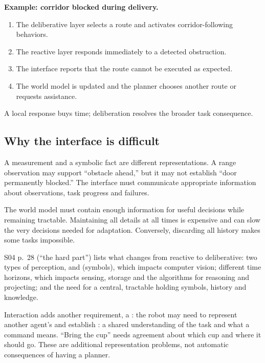 \textbf{Example: corridor blocked during delivery.}
\begin{enumerate}
\item The deliberative layer selects a route and activates corridor-following behaviors.
\item The reactive layer responds immediately to a detected obstruction.
\item The interface reports that the route cannot be executed as expected.
\item The world model is updated and the planner chooses another route or requests assistance.
\end{enumerate}
A local response buys time; deliberation resolves the broader task consequence.

\subsection{Why the interface is difficult}
A measurement and a symbolic fact are different representations. A range observation may support ``obstacle ahead,'' but it may not establish ``door permanently blocked.'' The interface must communicate appropriate information about observations, task progress and failures.

The world model must contain enough information for useful decisions while remaining tractable. Maintaining all details at all times is expensive and can slow the very decisions needed for adaptation. Conversely, discarding all history makes some tasks impossible.

S04 p.~28 (``the hard part'') lists what changes from reactive to deliberative: two types of perception,  and  (symbols), which impacts computer vision; different time horizons, which impacts sensing, storage and the algorithms for reasoning and projecting; and the need for a central, tractable  holding symbols, history and knowledge.

Interaction adds another requirement, a : the robot may need to represent another agent's  and establish : a shared understanding of the task and what a command means. ``Bring the cup'' needs agreement about which cup and where it should go. These are additional representation problems, not automatic consequences of having a planner.

